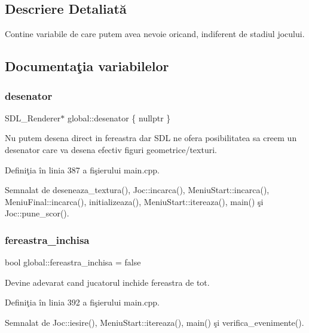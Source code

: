 \subsection{Descriere Detaliată}
Contine variabile de care putem avea nevoie oricand, indiferent de stadiul jocului. 

\subsection{Documentaţia variabilelor}
\mbox{\label{namespaceglobal_ae80ab1c7d78e562614d35c3b78e44ea3}} 
\subsubsection{\texorpdfstring{desenator}{desenator}}
{\footnotesize\ttfamily S\+D\+L\+\_\+\+Renderer$\ast$ global\+::desenator \{ nullptr \}}

Nu putem desena direct in fereastra dar S\+DL ne ofera posibilitatea sa creem un \textquotesingle{}desenator\textquotesingle{} care va desena efectiv figuri geometrice/texturi. 

Definiţia în linia 387 a fişierului main.\+cpp.



Semnalat de deseneaza\+\_\+textura(), Joc\+::incarca(), Meniu\+Start\+::incarca(), Meniu\+Final\+::incarca(), initializeaza(), Meniu\+Start\+::itereaza(), main() şi Joc\+::pune\+\_\+scor().

\mbox{\label{namespaceglobal_a930b1255fa49cd41dc635136822d56ee}} 
\subsubsection{\texorpdfstring{fereastra\+\_\+inchisa}{fereastra\_inchisa}}
{\footnotesize\ttfamily bool global\+::fereastra\+\_\+inchisa = false}

Devine adevarat cand jucatorul inchide fereastra de tot. 

Definiţia în linia 392 a fişierului main.\+cpp.



Semnalat de Joc\+::iesire(), Meniu\+Start\+::itereaza(), main() şi verifica\+\_\+evenimente().

